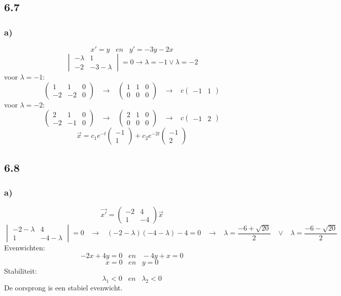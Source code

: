 \documentclass[11pt]{article}
\begin{document}
\subsection*{6.7}
\subsubsection*{a)}
\[
x'=y 
\;\;\;en\;\;\;
y'=-3y-2x
\]
\[
\begin{vmatrix}
-\lambda & 1\\
-2 & -3-\lambda
\end{vmatrix}
=0
\longrightarrow
\lambda = -1 \vee \lambda = -2
\]
voor $\lambda=-1$:
\[
\left(
\begin{array}{cc|c}
1 & 1 & 0\\
-2 & -2 & 0
\end{array}
\right)
\;\;\;\longrightarrow\;\;\;
\left(
\begin{array}{cc|c}
1 & 1 & 0\\
0 & 0 & 0
\end{array}
\right)
\;\;\;\longrightarrow\;\;\;
c
\begin{pmatrix}
-1 & 1
\end{pmatrix}
\]
voor $\lambda=-2$:
\[
\left(
\begin{array}{cc|c}
2 & 1 & 0\\
-2 & -1 & 0
\end{array}
\right)
\;\;\;\longrightarrow\;\;\;
\left(
\begin{array}{cc|c}
2 & 1 & 0\\
0 & 0 & 0
\end{array}
\right)
\;\;\;\longrightarrow\;\;\;
c
\begin{pmatrix}
-1 & 2
\end{pmatrix}
\]
\[
\vec{x}=
c_1e^{-t}
\begin{pmatrix}
-1\\1
\end{pmatrix}
+ c_2e^{-2t}
\begin{pmatrix}
-1\\2
\end{pmatrix}
\]

\subsection*{6.8}
\subsubsection*{a)}
\[
\vec{x'} = 
\begin{pmatrix}
-2 & 4\\
1 & -4
\end{pmatrix}
\vec{x}
\]
\[
\begin{vmatrix}
-2-\lambda & 4 \\
1 & -4-\lambda
\end{vmatrix}
=0
\;\;\;\longrightarrow\;\;\;
(-2-\lambda)(-4-\lambda)-4=0
\;\;\;\longrightarrow\;\;\;
\lambda = \frac{-6+\sqrt{20}}{2} \;\;\;\vee\;\;\;\lambda = \frac{-6-\sqrt{20}}{2}
\]
Evenwichten:
\[
-2x+4y=0 \;\;\;en\;\;\; -4y+x=0
\]
\[
x=0 \;\;\;en\;\;\; y=0
\]
Stabiliteit:
\[
\lambda_1 < 0 \;\;\;en\;\;\; \lambda_2 < 0
\]
De oorsprong is een stabiel evenwicht.
\end{document}
